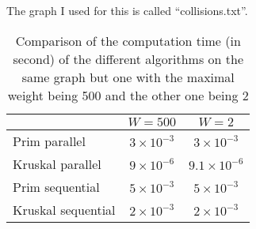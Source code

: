 \documentclass[
10pt, %
a4paper, %
oneside, %
headinclude,footinclude, %
BCOR5mm, %
]{scrartcl}
\begin{document}
The graph I used for this is called ``collisions.txt''.

\begin{table}
  \centering
  \begin{tabular}{|l|c|c|}
    \hline
    & $W=500$& $W=2$\\
    \hline    
    Prim parallel & $3\times 10^{-3}$ & $3\times 10^{-3}$\\
    \hline    
    Kruskal parallel & $9\times 10^{-6}$ & $9.1\times 10^{-6}$\\
    \hline    
    Prim sequential  & $5\times 10^{-3}$ & $5\times 10^{-3}$\\
    \hline    
    Kruskal sequential & $2\times 10^{-3}$ & $2\times 10^{-3}$\\
    \hline                           
  \end{tabular}
  \caption{Comparison of the computation time (in second) of the
    different algorithms on the same graph but one with the maximal
    weight being 500 and the other one being 2}
  \label{tab:collisions}
\end{table}
\end{document}
